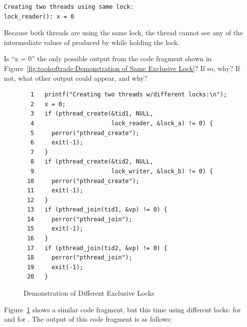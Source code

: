 \vspace{5pt}
\begin{minipage}[t]{\columnwidth}
\scriptsize
\begin{verbatim}
Creating two threads using same lock:
lock_reader(): x = 0
\end{verbatim}
\end{minipage}
\vspace{5pt}

Because both threads are using the same lock, the 
thread cannot see any of the intermediate values of  produced
by  while holding the lock.

\QuickQuiz{}
	Is ``x = 0'' the only possible output from the code fragment
	shown in
	Figure~\ref{fig:toolsoftrade:Demonstration of Same Exclusive Lock}?
	If so, why?
	If not, what other output could appear, and why?
 \QuickQuizEnd

\begin{figure}[tbp]
{ \scriptsize
\begin{verbatim}
  1   printf("Creating two threads w/different locks:\n");
  2   x = 0;
  3   if (pthread_create(&tid1, NULL,
  4                      lock_reader, &lock_a) != 0) {
  5     perror("pthread_create");
  6     exit(-1);
  7   }
  8   if (pthread_create(&tid2, NULL,
  9                      lock_writer, &lock_b) != 0) {
 10     perror("pthread_create");
 11     exit(-1);
 12   }
 13   if (pthread_join(tid1, &vp) != 0) {
 14     perror("pthread_join");
 15     exit(-1);
 16   }
 17   if (pthread_join(tid2, &vp) != 0) {
 18     perror("pthread_join");
 19     exit(-1);
 20   }
\end{verbatim}
}
\caption{Demonstration of Different Exclusive Locks}
\label{fig:toolsoftrade:Demonstration of Different Exclusive Locks}
\end{figure}

Figure~\ref{fig:toolsoftrade:Demonstration of Different Exclusive Locks}
shows a similar code fragment, but this time using different locks:
 for  and  for
.
The output of this code fragment is as follows:

